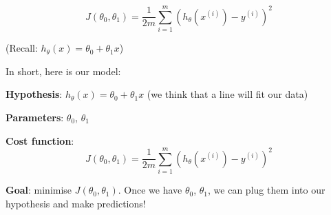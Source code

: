 \documentclass[12pt]{article}
\begin{document}
\[J(\theta_0, \theta_1) = \frac{1}{2m} \sum^m_{i=1}(h_\theta(x^{(i)}) - y^{(i)})^2\]

(Recall: $h_\theta(x) = \theta_0 + \theta_1x$)

In short, here is our model:

\textbf{Hypothesis}: $h_\theta(x) = \theta_0 + \theta_1x$ (we think that a line will fit our data)

\textbf{Parameters}: $\theta_0$, $\theta_1$

\textbf{Cost function}: \[J(\theta_0, \theta_1) = \frac{1}{2m} \sum^m_{i=1}(h_\theta(x^{(i)}) - y^{(i)})^2\]

\textbf{Goal}: minimise $J(\theta_0, \theta_1)$. Once we have $\theta_0$, $\theta_1$, we can plug them into our hypothesis and make predictions!
\end{document}
